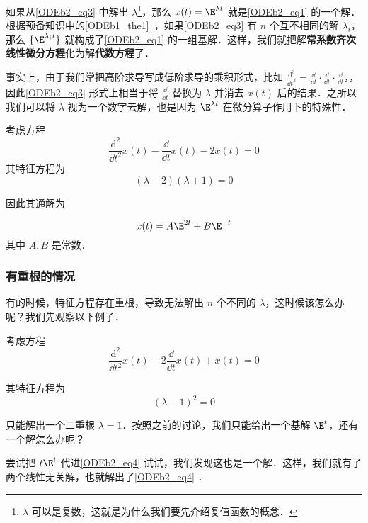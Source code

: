 如果从\autoref{ODEb2_eq3} 中解出 $\lambda$\footnote{$\lambda$ 可以是复数，这就是为什么我们要先介绍复值函数的概念．}，那么 $x(t)=\E^{\lambda t}$ 就是\autoref{ODEb2_eq1} 的一个解．根据预备知识中的\autoref{ODEb1_the1}~，如果\autoref{ODEb2_eq3} 有 $n$ 个互不相同的解 $\lambda_i$，那么 $\{\E^{\lambda_i t}\}$ 就构成了\autoref{ODEb2_eq1} 的一组基解．这样，我们就把解\textbf{常系数齐次线性微分方程}化为解\textbf{代数方程}了．


事实上，由于我们常把高阶求导写成低阶求导的乘积形式，比如 $\frac{\mathrm{d}^3}{\dd t^3}=\frac{\dd }{\dd t}\cdot\frac{\dd }{\dd t}\cdot\frac{\dd }{\dd t}$，，因此\autoref{ODEb2_eq3} 形式上相当于将 $\frac{\dd }{\dd t}$ 替换为 $\lambda$ 并消去 $x(t)$ 后的结果．之所以我们可以将 $\lambda$ 视为一个数字去解，也是因为 $\E^{\lambda t}$ 在微分算子作用下的特殊性．


\begin{example}{}
考虑方程
\begin{equation}
\frac{\mathrm{d}^2}{\dd t^2}x(t)-\frac{\dd }{\dd t}x(t)-2x(t)=0
\end{equation}
其特征方程为
\begin{equation}
(\lambda-2)(\lambda+1)=0
\end{equation}

因此其通解为

\begin{equation}
x(t)=A\E^{2t}+B\E^{-t}
\end{equation}
其中 $A, B$ 是常数．




\end{example}






\subsubsection{有重根的情况}



有的时候，特征方程存在重根，导致无法解出 $n$ 个不同的 $\lambda$，这时候该怎么办呢？我们先观察以下例子．

\begin{example}{}\label{ODEb2_ex1}
考虑方程
\begin{equation}\label{ODEb2_eq4}
\frac{\mathrm{d}^2}{\dd t^2}x(t)-2\frac{\dd }{\dd t}x(t)+x(t)=0
\end{equation}

其特征方程为
\begin{equation}
(\lambda-1)^2=0
\end{equation}

只能解出一个二重根 $\lambda=1$．按照之前的讨论，我们只能给出一个基解 $\E^{t}$，还有一个解怎么办呢？

尝试把 $t\E^{t}$ 代进\autoref{ODEb2_eq4} 试试，我们发现这也是一个解．这样，我们就有了两个线性无关解，也就解出了\autoref{ODEb2_eq4} ．




\end{example}




